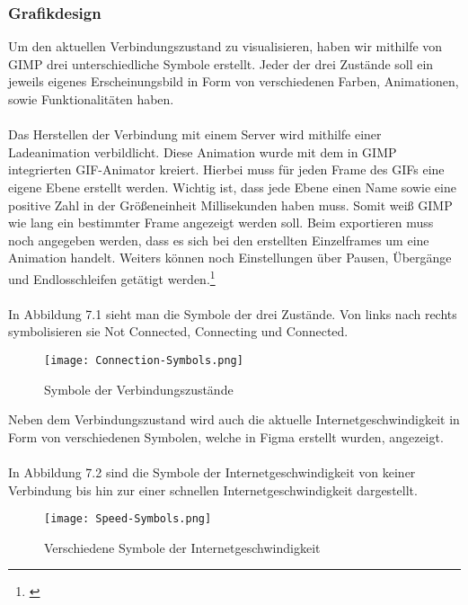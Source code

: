 \subsubsection{Grafikdesign}

Um den aktuellen Verbindungszustand zu visualisieren, haben wir mithilfe von GIMP drei unterschiedliche Symbole erstellt. Jeder der drei Zustände soll ein jeweils eigenes Erscheinungsbild in Form von verschiedenen Farben, Animationen, sowie Funktionalitäten haben. 
\\ \ \\
Das Herstellen der Verbindung mit einem Server wird mithilfe einer Ladeanimation verbildlicht. Diese Animation wurde mit dem in GIMP integrierten GIF-Animator kreiert. Hierbei muss für jeden Frame des GIFs eine eigene Ebene erstellt werden. Wichtig ist, dass jede Ebene einen Name sowie eine positive Zahl in der Größeneinheit Millisekunden haben muss. Somit weiß GIMP wie lang ein bestimmter Frame angezeigt werden soll. Beim exportieren muss noch angegeben werden, dass es sich bei den erstellten Einzelframes um eine Animation handelt. Weiters können noch Einstellungen über Pausen, Übergänge und Endlosschleifen getätigt werden.\footnote[1]{\cite[Vgl.][]{GIF}}
\\ \ \\
In Abbildung 7.1 sieht man die Symbole der drei Zustände. Von links nach rechts symbolisieren sie Not Connected, Connecting und Connected.
\\
\begin{figure}[H]
    \centering
    \texttt{[image: Connection-Symbols.png]}
    \caption[Symbole der Verbindungszustände]{Symbole der Verbindungszustände} 
\end{figure}
\noindent
Neben dem Verbindungszustand wird auch die aktuelle Internetgeschwindigkeit in Form von verschiedenen Symbolen, welche in Figma erstellt wurden, angezeigt.
\\ \ \\
In Abbildung 7.2 sind die Symbole der Internetgeschwindigkeit von keiner Verbindung bis hin zur einer schnellen Internetgeschwindigkeit dargestellt.
\\
\begin{figure}[H]
    \centering
    \texttt{[image: Speed-Symbols.png]}
    \caption[Verschiedene Symbole der Internetgeschwindigkeit]{Verschiedene Symbole der Internetgeschwindigkeit} 
\end{figure}

\pagebreak

